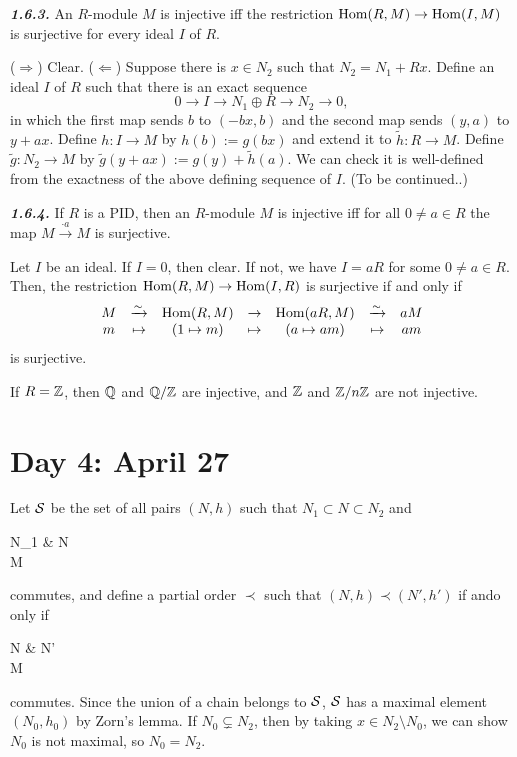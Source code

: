 \documentclass{../../small}
\begin{document}
\begin{prop*}\hspace{-5pt}\textbf{\emph{1.6.3.}}
An $R$-module $M$ is injective iff the restriction $\operatorname{Hom}(R,M)\to\operatorname{Hom}(I,M)$ is surjective for every ideal $I$ of $R$.
\end{prop*}
\begin{pf}
($\Rightarrow$) Clear.
($\Leftarrow$) Suppose there is $x\in N_2$ such that $N_2=N_1+Rx$.
Define an ideal $I$ of $R$ such that there is an exact sequence
\[0 \to I \to N_1\oplus R \to N_2 \to 0,\]
in which the first map sends $b$ to $(-bx,b)$ and the second map sends $(y,a)$ to $y+ax$.
Define $h:I\to M$ by $h(b):=g(bx)$ and extend it to $\tilde h:R\to M$.
Define $\tilde g:N_2\to M$ by $\tilde g(y+ax):=g(y)+\tilde h(a)$.
We can check it is well-defined from the exactness of the above defining sequence of $I$.
(To be continued..)
\end{pf}

\begin{cor*}\hspace{-5pt}\textbf{\emph{1.6.4.}}
If $R$ is a PID, then an $R$-module $M$ is injective iff for all $0\ne a\in R$ the map $M\xrightarrow{\cdot a}M$ is surjective.
\end{cor*}
\begin{pf}
Let $I$ be an ideal.
If $I=0$, then clear.
If not, we have $I=aR$ for some $0\ne a\in R$.
Then, the restriction $\operatorname{Hom}(R,M)\to\operatorname{Hom}(I,R)$ is surjective if and only if
\[\begin{array}{ccccccc}
M&\xrightarrow{\sim}&\operatorname{Hom}(R,M)&\to&\operatorname{Hom}(aR,M)&\xrightarrow{\sim}&aM\\
m&\mapsto&(1\mapsto m)&\mapsto&(a\mapsto am)&\mapsto&am
\end{array}\]
is surjective.
\end{pf}

\begin{ex*}
If $R=\mathbb{Z}$, then $\mathbb{Q}$ and $\mathbb{Q}/\mathbb{Z}$ are injective, and $\mathbb{Z}$ and $\mathbb{Z}/n\mathbb{Z}$ are not injective.
\end{ex*}



\newpage
\section{Day 4: April 27}

\begin{pf}[Proof of 1.6.3.]
Let $\mathcal{S}$ be the set of all pairs $(N,h)$ such that $N_1\subset N\subset N_2$ and
\begin{cd}
N_1  & N\\
M
\end{cd}
commutes, and define a partial order $\prec$ such that $(N,h)\prec(N',h')$ if ando only if
\begin{cd}
N  & N'\\
M
\end{cd}
commutes.
Since the union of a chain belongs to $\mathcal{S}$, $\mathcal{S}$ has a maximal element $(N_0,h_0)$ by Zorn's lemma.
If $N_0\subsetneq N_2$, then by taking $x\in N_2\setminus N_0$, we can show $N_0$ is not maximal, so $N_0=N_2$.
\end{pf}
\end{document}

